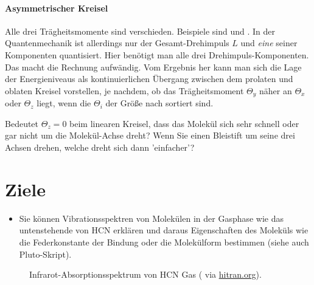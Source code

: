 \paragraph{Asymmetrischer Kreisel} Alle drei Trägheitsmomente sind verschieden. Beispiele sind  und . In der Quantenmechanik ist allerdings nur der Gesamt-Drehimpuls $L$ und \emph{eine} seiner Komponenten quantisiert. Hier benötigt man alle drei Drehimpuls-Komponenten. Das macht die Rechnung aufwändig. Vom Ergebnis her kann man sich die Lage der Energieniveaus als kontinuierlichen Übergang zwischen dem prolaten und oblaten Kreisel vorstellen, je nachdem, ob das Trägheitsmoment $\Theta_y$ näher an $\Theta_x$ oder $\Theta_z$ liegt, wenn die $\Theta_i$ der Größe nach sortiert sind.
\begin{marginfigure}
\end{marginfigure}


\begin{questions} 
\item Bedeutet $\Theta_z = 0$ beim linearen Kreisel, dass das Molekül sich sehr schnell oder gar nicht um die Molekül-Achse dreht? Wenn Sie einen Bleistift um seine drei Achsen drehen, welche dreht sich dann 'einfacher'?
\end{questions}







\section{Ziele}

\begin{itemize}
\item Sie können Vibrationsspektren von Molekülen in der Gasphase wie das untenstehende von HCN erklären und daraus Eigenschaften des Moleküls wie die  Federkonstante der Bindung oder die  Molekülform bestimmen  (siehe auch Pluto-Skript).
\end{itemize}


\begin{figure}
\caption{Infrarot-Absorptionsspektrum von HCN Gas  (\cite{Maki_1995_HCN} via \href{https://hitran.org}{hitran.org}).
\label{fig:vib_hcn}}
\end{figure}


